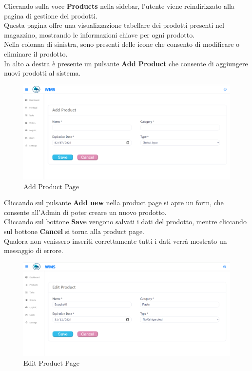 Cliccando sulla voce \textbf{Products} nella sidebar, l'utente viene reindirizzato alla pagina di gestione dei prodotti.\\
Questa pagina offre una visualizzazione tabellare dei prodotti presenti nel magazzino,
mostrando le informazioni chiave per ogni prodotto.\\
Nella colonna di sinistra, sono presenti delle icone che consento di modificare o eliminare il prodotto.\\
In alto a destra è presente un pulsante \textbf{Add Product} che consente di aggiungere nuovi prodotti al sistema.

\begin{figure}[H]
    \centering
    \includegraphics[width=\textwidth]{document/sections/img/Storyboard/addProductPage.png}
    \caption{Add Product Page}
    \label{fig:addProductPages}
\end{figure}

Cliccando sul pulsante \textbf{Add new} nella product page si apre un form, che consente
all'Admin di poter creare un nuovo prodotto.\\
Cliccando sul bottone \textbf{Save} vengono salvati i dati del prodotto, mentre cliccando sul bottone \textbf{Cancel} si torna alla product page.\\
Qualora non venissero inseriti correttamente tutti i dati verrà mostrato un messaggio di errore.

\begin{figure}[H]
    \centering
    \includegraphics[width=\textwidth]{document/sections/img/Storyboard/editProductPage.png}
    \caption{Edit Product Page}
    \label{fig:editProductPage}
\end{figure}

